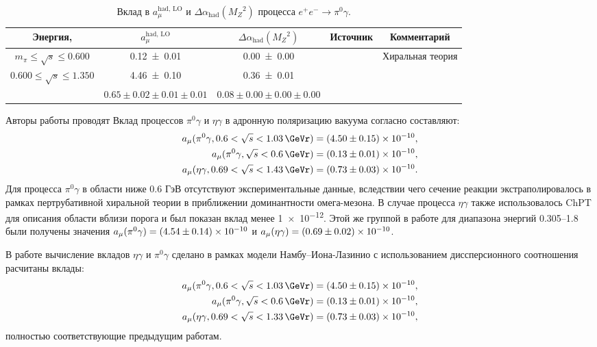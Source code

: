 \begin{table}
	\centering
	\caption{Вклад в $a_\mu^{\text{had, LO}}$ и $\Delta \alpha_{\text{had}} ({M_Z}^2) $ процесса 
		$e^+ e^- \to \pi^0 \gamma$.}\label{tab:amm_etag}
	\begin{tabular}{ccccc}
		Энергия, \si{\GeVr} & $a_\mu^{\text{had, LO}}$ & $\Delta \alpha_{\text{had}} ({M_Z}^2) $ & Источник & Комментарий \\
		\hline
		$m_\pi \leq \sqrt{s} \leq 0.600 $ & \num{0.12 \pm 0.01} & \num{0.00 \pm 0.00} & \cite{KNT18} & Хиральная теория \\
		$0.600 \leq \sqrt{s} \leq 1.350 $ & \num{4.46 \pm 0.10} & \num{0.36 \pm 0.01} & \cite{KNT18} & \\
		 & $0.65 \pm 0.02 \pm 0.01 \pm 0.01$ & $0.08 \pm 0.00 \pm 0.00 \pm 0.00$ & \cite{Davier:2017zfy} & 
	\end{tabular}
\end{table}
Авторы работы \cite{Davier:2017zfy} проводят
Вклад процессов $\pi^0\gamma$ и $\eta\gamma$ в адронную поляризацию вакуума согласно \cite{Hagiwara:2003da} составляют:
\begin{align}
    a_\mu ( \pi^0 \gamma, 0.6 < \sqrt{s} < \SI{1.03}{\GeVr} ) =
    \num{4.50+-0.15e-10} , \\
    a_\mu ( \pi^0 \gamma, \sqrt{s} < \SI{0.6}{\GeVr} ) =
    \num{0.13+-0.01e-10} , \\
    a_\mu ( \eta \gamma, 0.69 < \sqrt{s} < \SI{1.43}{\GeVr} ) =
    \num{0.73+-0.03e-10} .
\end{align}
Для процесса $\pi^0 \gamma$ в области ниже 0.6 ГэВ отсутствуют экспериментальные данные, вследствии чего сечение реакции экстраполировалось в рамках пертрубативной хиральной теории в приближении доминантности омега-мезона.
В случае процесса $\eta \gamma$ также использовалось ChPT для описания области вблизи порога и был показан вклад менее \num{1e-12}.
Этой же группой в работе \cite{Hagiwara:2011af} для диапазона энергий \SIrange{0.305}{1.8}{\GeVr} были получены значения $a_\mu(\pi^0\gamma) = \num{4.54+-.14e-10}$ и $a_\mu(\eta\gamma) = \num{0.69+-.02e-10}$.

В работе \cite{Ahmadov:2010hq} вычисление вкладов $\eta \gamma$ и $\pi^0 \gamma$ сделано в рамках модели Намбу--Иона-Лазинио с использованием диссперсионного соотношения расчитаны вклады:
\begin{align}
    a_\mu ( \pi^0 \gamma, 0.6 < \sqrt{s} < \SI{1.03}{\GeVr} ) =
    \num{4.5+-0.15e-10} , \\
    a_\mu ( \pi^0 \gamma, \sqrt{s} < \SI{0.6}{\GeVr} ) =
    \num{0.13+-0.01e-10} , \\
    a_\mu ( \eta \gamma, 0.69 < \sqrt{s} < \SI{1.33}{\GeVr} ) =
    \num{0.73+-0.03e-10} ,
\end{align}
полностью соответствующие предыдущим работам.


